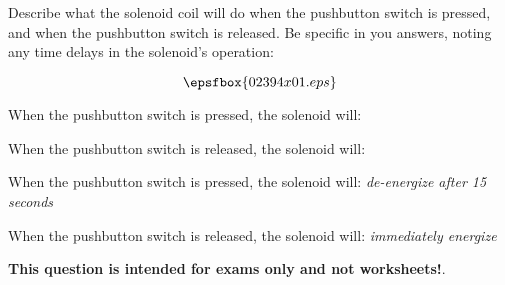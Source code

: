 

Describe what the solenoid coil will do when the pushbutton switch is pressed, and when the pushbutton switch is released.  Be specific in you answers, noting any time delays in the solenoid's operation:

$$\epsfbox{02394x01.eps}$$

When the pushbutton switch is pressed, the solenoid will:

\vskip 20pt

When the pushbutton switch is released, the solenoid will:







When the pushbutton switch is pressed, the solenoid will: {\it de-energize after 15 seconds}

\vskip 10pt

When the pushbutton switch is released, the solenoid will: {\it immediately energize}







{\bf This question is intended for exams only and not worksheets!}.




